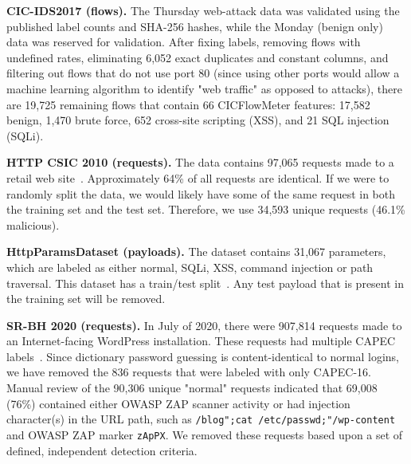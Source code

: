 \documentclass[conference]{IEEEtran}
\begin{document}


\textbf{CIC-IDS2017 (flows).} The Thursday web-attack data was validated using the published label counts and SHA-256 hashes, while the Monday (benign only) data was reserved for validation. After fixing labels, removing flows with undefined rates, eliminating 6,052 exact duplicates and constant columns, and filtering out flows that do not use port 80 (since using other ports would allow a machine learning algorithm to identify "web traffic" as opposed to attacks), there are 19,725 remaining flows that contain 66 CICFlowMeter features: 17,582 benign, 1,470 brute force, 652 cross-site scripting (XSS), and 21 SQL injection (SQLi).

\textbf{HTTP CSIC 2010 (requests).} The data contains 97,065 requests made to a retail web site~\cite{csic2010}. Approximately 64\% of all requests are identical. If we were to randomly split the data, we would likely have some of the same request in both the training set and the test set. Therefore, we use 34,593 unique requests (46.1\% malicious).

\textbf{HttpParamsDataset (payloads).} The dataset contains 31,067 parameters, which are labeled as either normal, SQLi, XSS, command injection or path traversal. This dataset has a train/test split~\cite{httpparams}. Any test payload that is present in the training set will be removed.

\textbf{SR-BH 2020 (requests).} In July of 2020, there were 907,814 requests made to an Internet-facing WordPress installation. These requests had multiple CAPEC labels~\cite{srbh2022}. Since dictionary password guessing is content-identical to normal logins, we have removed the 836 requests that were labeled with only CAPEC-16. Manual review of the 90,306 unique "normal" requests indicated that 69,008 (76\%) contained either OWASP ZAP scanner activity or had injection character(s) in the URL path, such as \texttt{/blog";cat /etc/passwd;"/wp-content} and OWASP ZAP marker \texttt{zApPX}. We removed these requests based upon a set of defined, independent detection criteria.
\end{document}
